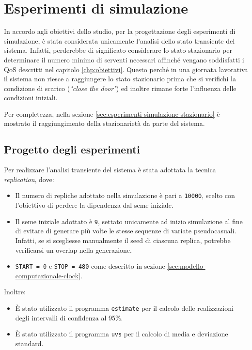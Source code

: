 \chapter{Esperimenti di simulazione}\label{chp:esperimenti-simulazione}
In accordo agli obiettivi dello studio, per la progettazione degli esperimenti di simulazione, è stata considerata unicamente l'analisi dello stato transiente del sistema. Infatti, perderebbe di significato considerare lo stato stazionario per determinare il numero minimo di serventi necessari affinché vengano soddisfatti i QoS descritti nel capitolo \ref{chp:obiettivi}. Questo perché in una giornata lavorativa il sistema non riesce a raggiungere lo stato stazionario prima che si verifichi la condizione di scarico (\textit{"close the door"}) ed inoltre rimane forte l'influenza delle condizioni iniziali. 

Per completezza, nella sezione \ref{sec:esperimenti-simulazione-stazionario} è mostrato il raggiungimento della stazionarietà da parte del sistema. 

\section{Progetto degli esperimenti}\label{sec:esperimenti-simulazione-1}
Per realizzare l'analisi transiente del sistema è stata adottata la tecnica \textit{replication}, dove:
\begin{itemize}
\item Il numero di repliche adottato nella simulazione è pari a \texttt{10000}, scelto con l'obiettivo di perdere la dipendenza dal seme iniziale.
\item Il seme iniziale adottato è \texttt{9}, settato unicamente ad inizio simulazione al fine di evitare di generare più volte le stesse sequenze di variate pseudocasuali. Infatti, se si scegliesse manualmente il seed di ciascuna replica, potrebbe verificarsi un overlap nella generazione.
\item \texttt{START = 0} e \texttt{STOP = 480} come descritto in sezione \ref{sec:modello-computazionale-clock}.
\end{itemize}

Inoltre:
\begin{itemize}
\item È stato utilizzato il programma \texttt{estimate} per il calcolo delle realizzazioni degli intervalli di confidenza al 95\%.
\item È stato utilizzato il programma \texttt{uvs} per il calcolo di media e deviazione standard.
\end{itemize}

